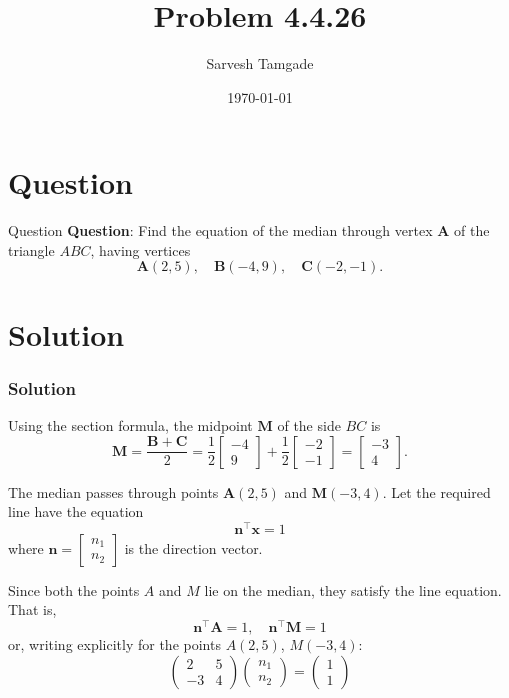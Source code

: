 \documentclass{beamer}
\title{Problem 4.4.26}
\author{Sarvesh Tamgade}
\date{\today}
\theoremstyle{remark}
\numberwithin{equation}{section}
\begin{document}
\begin{frame}
\titlepage
\end{frame}

\section{Question}
\begin{frame}{Question}
\textbf{Question}:
 Find the equation of the median through vertex \(\mathbf{A}\) of the triangle \(ABC\), having vertices
\[
\mathbf{A}(2,5), \quad \mathbf{B}(-4,9), \quad \mathbf{C}(-2,-1).
\]

\end{frame}

\section{Solution}
\begin{frame}[fragile]
    \frametitle{Solution}
Using the section formula, the midpoint \(\mathbf{M}\) of the side \(BC\) is 
\[
\mathbf{M} = \frac{\mathbf{B} + \mathbf{C}}{2} = 
\frac{1}{2} \begin{bmatrix} -4 \\ 9 \end{bmatrix} + 
\frac{1}{2} \begin{bmatrix} -2 \\ -1 \end{bmatrix} = 
\begin{bmatrix} -3 \\ 4 \end{bmatrix}.
\]

The median passes through points \(\mathbf{A}(2,5)\) and \(\mathbf{M}(-3,4)\).
Let the required line have the equation
\[
\mathbf{n}^\top \mathbf{x} = 1
\]
where \( \mathbf{n} = \begin{bmatrix} n_1 \\ n_2 \end{bmatrix} \) is the direction vector.

Since both the points \( A \) and \( M \) lie on the median, they satisfy the line equation. That is,
\[
\mathbf{n}^\top \mathbf{A} = 1, \quad \mathbf{n}^\top \mathbf{M} = 1
\]
or, writing explicitly for the points \( A(2,5) \), \( M(-3,4) \):
\[
\begin{pmatrix}
2 & 5 \\
-3 & 4
\end{pmatrix}
\begin{pmatrix}
n_1 \\ n_2
\end{pmatrix}
=
\begin{pmatrix}
1 \\ 1
\end{pmatrix}
\]

\end{frame}
\end{document}
